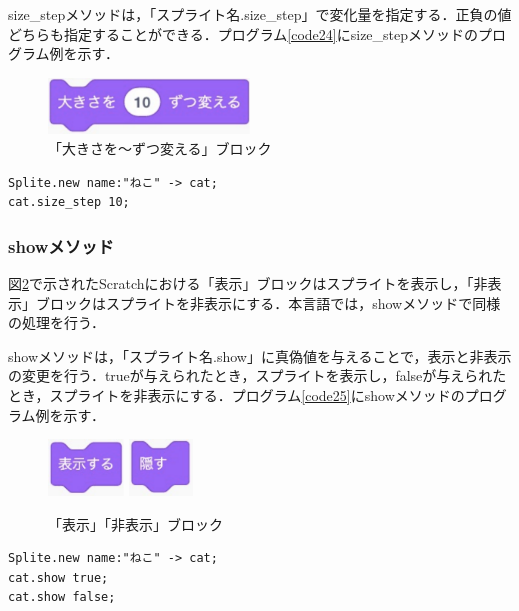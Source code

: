 \documentclass[10pt,a4j]{ltjsarticle}
\begin{document}
size\_stepメソッドは，「スプライト名.size\_step」で変化量を指定する．正負の値どちらも指定することができる．プログラム\ref{code24}にsize\_stepメソッドのプログラム例を示す．

\begin{figure}[H]
  \centering
  \includegraphics[height=15mm]{images/size_step.pdf}
  \caption{「大きさを〜ずつ変える」ブロック}
  \label{fig:size_step}
\end{figure}

\begin{lstlisting}[caption=size\_stepメソッドのプログラム例, label=code24]
Splite.new name:"ねこ" -> cat;
cat.size_step 10;
\end{lstlisting}

\subsubsection{showメソッド}
図\ref{fig:show}で示されたScratchにおける「表示」ブロックはスプライトを表示し，「非表示」ブロックはスプライトを非表示にする．本言語では，showメソッドで同様の処理を行う．

showメソッドは，「スプライト名.show」に真偽値を与えることで，表示と非表示の変更を行う．trueが与えられたとき，スプライトを表示し，falseが与えられたとき，スプライトを非表示にする．プログラム\ref{code25}にshowメソッドのプログラム例を示す．

\begin{figure}[H]
  \centering
  \includegraphics[height=15mm]{images/show.pdf} 
  \includegraphics[height=15mm]{images/hide.pdf}
  \caption{「表示」「非表示」ブロック}
  \label{fig:show}
\end{figure}

\begin{lstlisting}[caption=showメソッドのプログラム例, label=code25]
Splite.new name:"ねこ" -> cat;
cat.show true;
cat.show false;
\end{lstlisting}
\end{document}
